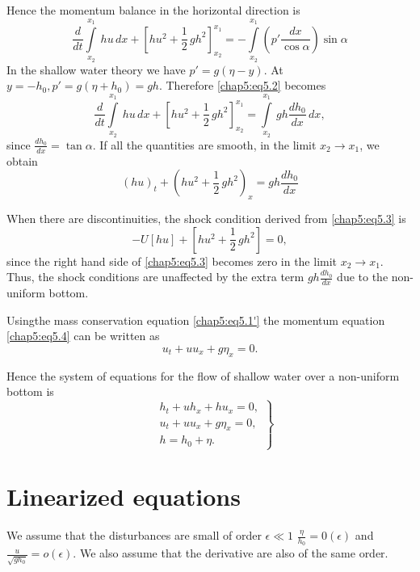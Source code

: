 Hence the momentum balance in the horizontal direction is 
\begin{equation}
\frac{d}{dt}\int\limits_{x_2}^{x_1}\,hu\,dx+\left[hu^2+\frac{1}{2}\,gh^2 \right]_{x_2}^{x_1}= -\int\limits_{x_2}^{x_1}\left(p'\frac{dx}{\cos\alpha}\right) \sin\alpha\tag{5.2}\label{chap5:eq5.2}
\end{equation}
In the shallow water theory we have $p'=g(\eta-y)$. At $y=-h_0, p'=g(\eta+h_0)=gh$. Therefore \eqref{chap5:eq5.2} becomes 
\begin{equation}
\frac{d}{dt}\int\limits_{x_2}^{x_1}\,hu\,dx+\left[hu^2+\frac{1}{2}\,gh^2 \right]_{x_2}^{x_1}=\int\limits_{x_2}^{x_1}\,gh\frac{dh_0}{dx}\,dx, \tag{5.3}\label{chap5:eq5.3}
\end{equation}
since $\frac{dh_0}{dx}=\tan\alpha$. If all the quantities are smooth, in the limit $x_2\to x_1$, we obtain
\begin{equation}
(hu)_t+\left(hu^2+\frac{1}{2}\,gh^2\right)_x=gh\frac{dh_0}{dx} \tag{5.4}\label{chap5:eq5.4}
\end{equation}

When there are discontinuities, the shock condition derived from \eqref{chap5:eq5.3} is 
$$
-U[hu]+\left[hu^2+\frac{1}{2}\,gh^2\right]=0,
$$
since the right hand side of \eqref{chap5:eq5.3} becomes zero in the limit $x_2\to x_1$. Thus, the shock conditions are unaffected by the extra term $gh\frac{dh_0}{dx}$ due to the non-uniform bottom. 

Using\pageoriginale the mass conservation equation \ref{chap5:eq5.1'} the momentum equation \eqref{chap5:eq5.4} can be written as 
$$
u_t+uu_x+g\eta_x=0.
$$

Hence the system of equations for the flow of shallow water over a non-uniform bottom is 
\begin{equation}
\left.
\begin{aligned}
& h_t+uh_x+hu_x = 0,\\
& u_t+uu_x+g\eta_x =0,\\
& h=h_0+\eta.
\end{aligned}
\right\}\tag{5.5}\label{chap5:eq5.5}
\end{equation}

\section{Linearized equations}\label{chap5:sec5.2}

We assume that the disturbances are small of order $\epsilon \ll 1$ \ie $\frac{\eta}{h_0}=0(\epsilon)$ and $\frac{u}{\sqrt{gh_0}}=o(\epsilon)$. We also assume that the derivative are also of the same order.

